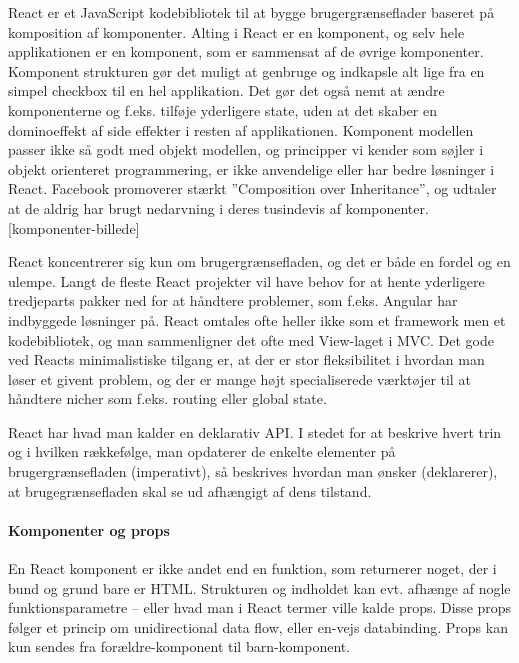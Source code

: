 \documentclass[]{article}
\let\oldparagraph\paragraph
\renewcommand{\paragraph}[1]{\oldparagraph{#1}\mbox{}}
\begin{document}
React er et JavaScript kodebibliotek til at bygge brugergrænseflader
baseret på komposition af komponenter. Alting i React er en komponent,
og selv hele applikationen er en komponent, som er sammensat af de
øvrige komponenter. Komponent strukturen gør det muligt at genbruge og
indkapsle alt lige fra en simpel checkbox til en hel applikation. Det
gør det også nemt at ændre komponenterne og f.eks. tilføje yderligere
state, uden at det skaber en dominoeffekt af side effekter i resten af
applikationen. Komponent modellen passer ikke så godt med objekt
modellen, og principper vi kender som søjler i objekt orienteret
programmering, er ikke anvendelige eller har bedre løsninger i React.
Facebook promoverer stærkt ''Composition over Inheritance'', og udtaler
at de aldrig har brugt nedarvning i deres tusindevis af komponenter.
{[}komponenter-billede{]}

React koncentrerer sig kun om brugergrænsefladen, og det er både en
fordel og en ulempe. Langt de fleste React projekter vil have behov for
at hente yderligere tredjeparts pakker ned for at håndtere problemer,
som f.eks. Angular har indbyggede løsninger på. React omtales ofte
heller ikke som et framework men et kodebibliotek, og man sammenligner
det ofte med View-laget i MVC. Det gode ved Reacts minimalistiske
tilgang er, at der er stor fleksibilitet i hvordan man løser et givent
problem, og der er mange højt specialiserede værktøjer til at håndtere
nicher som f.eks. routing eller global state.

React har hvad man kalder en deklarativ API. I stedet for at beskrive
hvert trin og i hvilken rækkefølge, man opdaterer de enkelte elementer
på brugergrænsefladen (imperativt), så beskrives hvordan man ønsker
(deklarerer), at brugegrænsefladen skal se ud afhængigt af dens
tilstand.

\hypertarget{komponenter-og-props}{%
\paragraph{Komponenter og props}\label{komponenter-og-props}}

En React komponent er ikke andet end en funktion, som returnerer noget,
der i bund og grund bare er HTML. Strukturen og indholdet kan evt.
afhænge af nogle funktionsparametre -- eller hvad man i React termer
ville kalde props. Disse props følger et princip om unidirectional data
flow, eller en-vejs databinding. Props kan kun sendes fra
forældre-komponent til barn-komponent.
\end{document}
